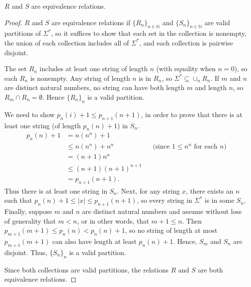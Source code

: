 \begin{lemma}
  $R$ and $S$ are equivalence relations.
\end{lemma}
\begin{proof}
  $R$ and $S$ are equivalence relations if $\{R_n\}_{n \in \mathbb{N}}$ and $\{S_n\}_{n \in \mathbb{N}}$ are valid partitions of $\Sigma^*$, so it suffices to show that each set in the collection is nonempty, the union of each collection includes all of $\Sigma^*$, and each collection is pairwise disjoint.

  The set $R_n$ includes at least one string of length $n$ (with equality when $n = 0$), so each $R_n$ is nonempty.
  Any string of length $n$ is in $R_n$, so $\Sigma^* \subseteq \cup_n R_n$.
  If $m$ and $n$ are distinct natural numbers, no string can have both length $m$ and length $n$, so $R_m \cap R_n = \emptyset$.
  Hence $\{R_n\}_n$ is a valid partition.

  We need to show $p_n(i) + 1 \leq p_{n + 1}(n + 1)$, in order to prove that there is at least one string (of length $p_n(n) + 1$) in $S_n$.
  \begin{align*}
    p_n(n) + 1 &= n (n^n) + 1 \\
    &\leq n (n^n) + n^n && \text{(since } 1 \leq n^n \text{ for each } n \text{)} \\
    &= (n + 1) n^n \\
    &\leq (n + 1) (n + 1)^{n + 1} \\
    &= p_{n + 1}(n + 1).
  \end{align*}
  Thus there is at least one string in $S_n$.
  Next, for any string $x$, there exists an $n$ such that $p_n(n) + 1 \leq |x| \leq p_{n + 1}(n + 1)$, so every string in $\Sigma^*$ is in some $S_n$.
  Finally, suppose $m$ and $n$ are distinct natural numbers and assume without loss of generality that $m < n$, or in other words, that $m + 1 \leq n$.
  Then $p_{m + 1}(m + 1) \leq p_n(n) < p_n(n) + 1$, so no string of length at most $p_{m + 1}(m + 1)$ can also have length at least $p_n(n) + 1$.
  Hence, $S_m$ and $S_n$ are disjoint.
  Thus, $\{S_n\}_n$ is a valid partition.

  Since both collections are valid partitions, the relations $R$ and $S$ are both equivalence relations.
\end{proof}

